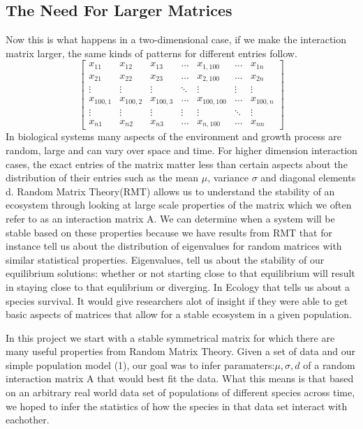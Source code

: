 \documentclass{article}
\begin{document}
\subsection{The Need For Larger Matrices}
\hfill\break
Now this is what happens in a two-dimensional case, if we make the interaction matrix larger, the same kinds of patterns for different entries follow.\hfill\break
$$
\begin{bmatrix}
   x_{11} & x_{12} & x_{13} & \dots &x_{1, 100}&\dots & x_{1n} \\
    x_{21} & x_{22} & x_{23} & \dots &x_{2,100}&\dots & x_{2n} \\
    \vdots & \vdots & \vdots & \ddots & \vdots &\vdots&\vdots \\
x_{100,1}&x_{100,2}&x_{100,3} &\dots & x_{100,100}&\dots& x_{100,n}\\ 
\vdots & \vdots& \vdots& \vdots& \vdots &\ddots&\vdots \\
    x_{n1} & x_{n2} & x_{n3} & \dots &x_{n,100}&\dots & x_{nn}
\end{bmatrix}
$$\hfill\break
In biological systems many aspects of the environment and growth process are random, large and can vary over space and time. For higher dimension interaction cases, the exact entries of the matrix matter less than certain aspects about the distribution of their entries such as the mean $\mu$, variance $\sigma$ and diagonal elements d. Random Matrix Theory(RMT) allows us to understand the stability of an ecosystem through looking at large scale properties of the matrix which we often refer to as an interaction matrix A. We can determine when a system will be stable based on these properties because we have results from RMT that for instance tell us about the distribution of eigenvalues for random matrices with similar statistical properties. Eigenvalues, tell us about the stability of our equilibrium solutions: whether or not starting close to that equilibrium will result in staying close to that equlibrium or diverging. In Ecology that tells us about a species survival. It would give researchers alot of insight if they were able to get basic aspects of matrices that allow for a stable ecosystem in a given population.   \hfill\break

In this project we start with a stable symmetrical matrix for which there are many useful properties from Random Matrix Theory. Given a set of data and our simple population model (1), our goal was to infer paramaters:$\mu,\sigma,d$ of a random interaction matrix A that would best fit the data. What this means is that based on an arbitrary real world data set of populations of different species across time, we hoped to infer the statistics of how the species in that data set interact with eachother.
\end{document}
